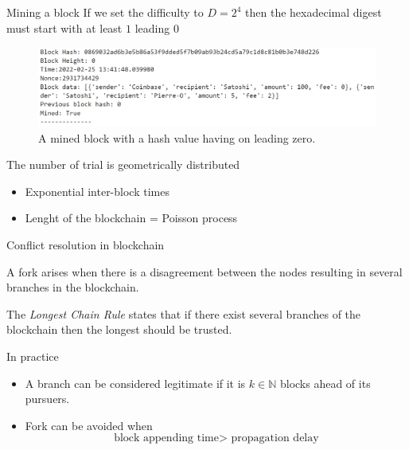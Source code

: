 \documentclass{beamer}
\begin{document}
\begin{frame}{Mining a block}
If we set the difficulty to $D = 2^4$ then the hexadecimal digest must start with at least $1$ leading $0$
\begin{figure}[!ht]
    \includegraphics[width = \textwidth]{../../Figures/block_mined.png}
    \captionsetup{width=0.8\textwidth}
    \centering
    \caption{A mined block with a hash value having on leading zero.}
    \label{fig:block_mined}
\end{figure}
The number of trial is geometrically distributed
\begin{itemize}
\item Exponential inter-block times
\item Lenght of the blockchain = Poisson process
\end{itemize}
\end{frame}
\begin{frame}{Conflict resolution in blockchain}
\begin{tcolorbox}[enhanced,drop shadow, title=Fork]
    A fork arises when there is a disagreement between the nodes resulting in several branches in the blockchain.
\end{tcolorbox}
\begin{tcolorbox}[enhanced,drop shadow, title=LCR]
    The \textit{Longest Chain Rule} states that if there exist several branches of the blockchain then the longest should be trusted.
\end{tcolorbox}
In practice 
\begin{itemize}
  \item A branch can be considered legitimate if it is $k\in\mathbb{N}$ blocks ahead of its pursuers.
  \item Fork can be avoided when
  $$
  \text{block appending time}> \text{ propagation delay} 
  $$
\end{itemize}
\end{frame}
\end{document}
